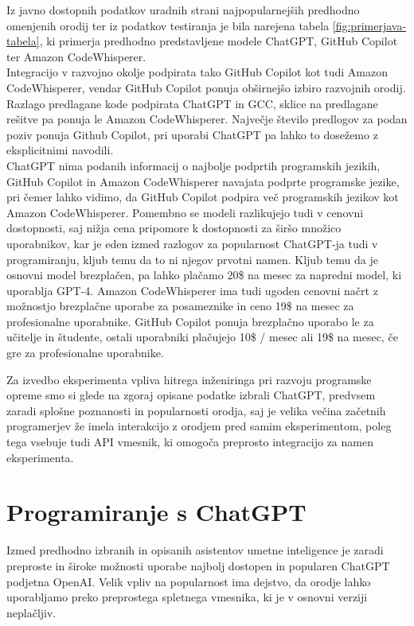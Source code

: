 \documentclass[a4paper,12pt,openright]{book}
\begin{document}
Iz javno dostopnih podatkov uradnih strani najpopularnejših predhodno omenjenih orodij \cite{github_copilot_chat, openai_chatgpt, saasworthy_codewhisperer} ter iz podatkov testiranja je bila narejena tabela \ref{fig:primerjava-tabela}, ki primerja predhodno predstavljene modele ChatGPT, GitHub Copilot ter Amazon CodeWhisperer.  \\
Integracijo v razvojno okolje podpirata tako GitHub Copilot kot tudi Amazon CodeWhisperer, vendar GitHub Copilot ponuja obširnejšo izbiro razvojnih orodij. Razlago predlagane kode podpirata ChatGPT in GCC, sklice na predlagane rešitve pa ponuja le Amazon CodeWhisperer. Največje število predlogov za podan poziv ponuja Github Copilot, pri uporabi ChatGPT pa lahko to dosežemo z eksplicitnimi navodili.\\
ChatGPT nima podanih informacij o najbolje podprtih programskih jezikih, GitHub Copilot in Amazon CodeWhisperer navajata podprte programske jezike, pri čemer lahko vidimo, da GitHub Copilot podpira več programskih jezikov kot Amazon CodeWhisperer. Pomembno se modeli razlikujejo tudi v cenovni dostopnosti, saj nižja cena pripomore k dostopnosti za širšo množico uporabnikov, kar je eden izmed razlogov za popularnost ChatGPT-ja tudi v programiranju, kljub temu da to ni njegov prvotni namen. Kljub temu da je osnovni model brezplačen, pa lahko plačamo 20\$ na mesec za napredni model, ki uporablja GPT-4. Amazon CodeWhisperer ima tudi ugoden cenovni načrt z možnostjo brezplačne uporabe za posameznike in ceno 19\$ na mesec za profesionalne uporabnike. GitHub Copilot ponuja brezplačno uporabo le za učitelje in študente, ostali uporabniki plačujejo 10\$ / mesec ali 19\$ na mesec, če gre za profesionalne uporabnike.
\cite{github_copilot_chat, openai_chatgpt, saasworthy_codewhisperer}

Za izvedbo eksperimenta vpliva hitrega inženiringa pri razvoju programske opreme smo si glede na zgoraj opisane podatke izbrali ChatGPT, predvsem zaradi splošne poznanosti in popularnosti orodja, saj je velika večina začetnih programerjev že imela interakcijo z orodjem pred samim eksperimentom, poleg tega vsebuje tudi API vmesnik, ki omogoča preprosto integracijo za namen eksperimenta.

\section{Programiranje s ChatGPT}
Izmed predhodno izbranih in opisanih asistentov umetne inteligence je zaradi preproste in široke možnosti uporabe najbolj dostopen in popularen ChatGPT podjetna OpenAI. Velik vpliv na popularnost ima dejstvo, da orodje lahko uporabljamo preko preprostega spletnega vmesnika, ki je v osnovni verziji neplačljiv.
\end{document}
